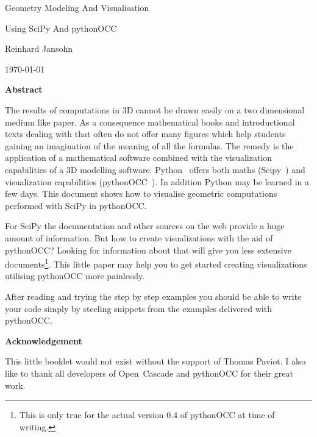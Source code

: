 \documentclass[12pt,a4paper,twoside]{article}
\begin{document}
\begin{titlepage}
\begin{center}
{
\large 
Geometry Modeling And Visualisation 

\vspace*{0.3cm}
Using SciPy And pythonOCC
}

{

\vspace*{0.75cm}
Reinhard Jansohn

\vspace{0.5cm}
\today
}
\end{center}
{

\vspace*{0.75cm}
{\small
\begin{center}
{\bf Abstract}
\end{center}
The results of computations in 3D cannot be drawn easily on a two dimensional medium like paper.
As a consequence mathematical books and introductional texts dealing with that often do not offer many figures which help students gaining an imagination of the meaning of all the formulas.
The remedy is the application of a mathematical software combined with the visualization capabilities of a 3D modelling software.
Python~\cite{PYTHON_ORG} offers both maths (Scipy~\cite{SCIPY_ORG}) and visualization capabilities (pythonOCC~\cite{PYTHONOCC_ORG}). 
In addition Python may be learned in a few days.
This document shows how to visualise geometric computations performed with SciPy in pythonOCC.

For SciPy the documentation and other sources on the web provide a huge amount of information.
But how to create visualizations with the aid of pythonOCC? 
Looking for information about that will give you less extensive documents\footnote{This is only true for the actual version 0.4 of pythonOCC at time of writing.}.
This little paper may help you to get started creating visualizations utilising pythonOCC more painlessly.

After reading and trying the step by step examples you should be able to write your code simply by steeling snippets from the examples delivered with pythonOCC.

\begin{center}
{\bf Acknowledgement}
\end{center}
This little booklet would not exist without the support of Thomas Paviot. I also like to thank all developers of Open~Cascade and pythonOCC for their great work.
}
}
\end{titlepage}




\tableofcontents




%
\appendix



\end{document}
